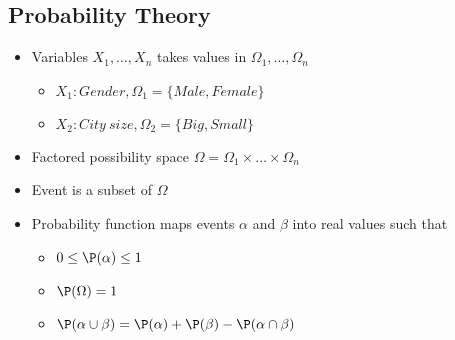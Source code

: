 \subsection{Probability Theory}
	\begin{frame}
		\begin{itemize}
			\item Variables $X_1, \ldots , X_n$ takes values in $\Omega_1 , \ldots , \Omega_n$
				\begin{itemize}
					\item $X_1: {Gender} , \Omega_1 = \{ {Male} , {Female} \}$
					\item $X_2: {City\ size} , \Omega_2 = \{ {Big} , {Small} \}$
				\end{itemize}
			\item Factored possibility space $\Omega = \Omega_1 \times \ldots \times \Omega_n$
			\item Event is a subset of $\Omega$
			\item Probability function maps events $\alpha$ and $\beta$ into real values such that
			\begin{itemize}
				\item $0 \leq \P( \alpha ) \leq 1 $
				\item $\P( \Omega ) = 1$
				\item $\P( \alpha \cup \beta ) = \P( \alpha ) + \P( \beta ) - \P( \alpha \cap \beta )$
			\end{itemize}
		\end{itemize}
	\end{frame}